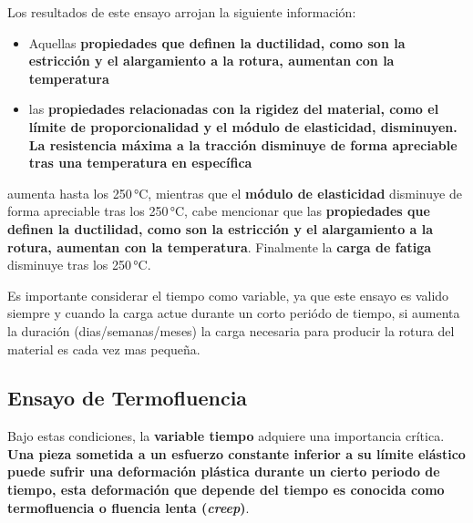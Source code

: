 Los resultados de este ensayo arrojan la siguiente información:
\begin{itemize}
    \item Aquellas \textbf{propiedades que definen la ductilidad, como son la estricción y el alargamiento a la rotura, aumentan con la temperatura}
    \item las \textbf{propiedades relacionadas con la rigidez del material, como el límite de proporcionalidad y el módulo de elasticidad, disminuyen. La resistencia máxima a la tracción disminuye de forma apreciable tras una temperatura en específica}
\end{itemize}

 aumenta hasta los 250\,°C, mientras que el \textbf{módulo de elasticidad} disminuye de forma apreciable tras los 250\,°C, cabe mencionar que las \textbf{propiedades que definen la ductilidad, como son la estricción y el alargamiento a la rotura, aumentan con la temperatura}. Finalmente la \textbf{carga de fatiga} disminuye tras los 250\,°C.

Es importante considerar el tiempo como variable, ya que este ensayo es valido siempre y cuando  la carga actue durante un corto periódo de tiempo, si aumenta la duración (dias/semanas/meses) la carga necesaria para producir la rotura del material es cada vez mas pequeña.


\subsection{Ensayo de Termofluencia}
Bajo estas condiciones, la \textbf{variable tiempo} adquiere una importancia crítica. \textbf{Una pieza sometida a un esfuerzo constante inferior a su límite elástico puede sufrir una deformación plástica durante un cierto periodo de tiempo, esta deformación que depende del tiempo es conocida como termofluencia o fluencia lenta (\textit{creep})}.

